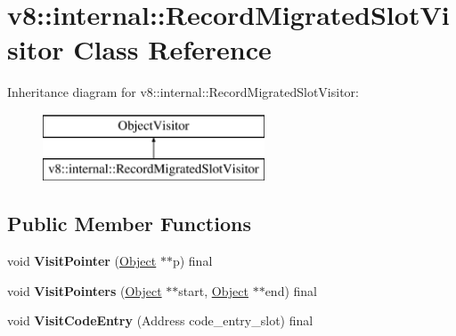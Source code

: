 \hypertarget{classv8_1_1internal_1_1_record_migrated_slot_visitor}{}\section{v8\+:\+:internal\+:\+:Record\+Migrated\+Slot\+Visitor Class Reference}
\label{classv8_1_1internal_1_1_record_migrated_slot_visitor}
Inheritance diagram for v8\+:\+:internal\+:\+:Record\+Migrated\+Slot\+Visitor\+:\begin{figure}[H]
\begin{center}
\leavevmode
\includegraphics[height=2.000000cm]{classv8_1_1internal_1_1_record_migrated_slot_visitor}
\end{center}
\end{figure}
\subsection*{Public Member Functions}
\begin{DoxyCompactItemize}
\item 
void {\bfseries Visit\+Pointer} (\hyperlink{classv8_1_1internal_1_1_object}{Object} $\ast$$\ast$p) final\hypertarget{classv8_1_1internal_1_1_record_migrated_slot_visitor_adfb684149483c79ded42cfd1c62da8b2}{}\label{classv8_1_1internal_1_1_record_migrated_slot_visitor_adfb684149483c79ded42cfd1c62da8b2}

\item 
void {\bfseries Visit\+Pointers} (\hyperlink{classv8_1_1internal_1_1_object}{Object} $\ast$$\ast$start, \hyperlink{classv8_1_1internal_1_1_object}{Object} $\ast$$\ast$end) final\hypertarget{classv8_1_1internal_1_1_record_migrated_slot_visitor_a65026909142d43f5357430c4ca74ee9e}{}\label{classv8_1_1internal_1_1_record_migrated_slot_visitor_a65026909142d43f5357430c4ca74ee9e}

\item 
void {\bfseries Visit\+Code\+Entry} (Address code\+\_\+entry\+\_\+slot) final\hypertarget{classv8_1_1internal_1_1_record_migrated_slot_visitor_acfb575d25934674802b7ee53d26a9293}{}\label{classv8_1_1internal_1_1_record_migrated_slot_visitor_acfb575d25934674802b7ee53d26a9293}

\end{DoxyCompactItemize}
